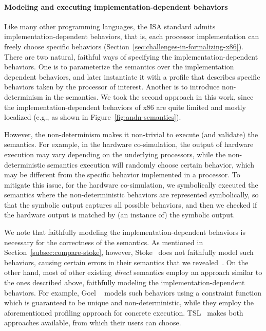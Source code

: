 \paragraph{Modeling and executing implementation-dependent behaviors}

Like many other programming languages, the \ISA ISA standard admits implementation-dependent behaviors, that is, each processor implementation can freely choose specific behaviors (Section~\ref{sec:challenges-in-formalizing-x86}).
There are two natural, faithful ways of specifying the implementation-dependent behaviors.
One is to parameterize the semantics over the implementation dependent behaviors, and later instantiate it with a profile that describes specific behaviors taken by the processor of interest.
Another is to introduce non-determinism in the semantics.
We took the second approach in this work, since the implementation-dependent behaviors of x86 are quite limited and mostly localized (e.g., as shown in Figure~\ref{fig:andn-semantics}).

However, the non-determinism makes it non-trivial to execute (and validate) the semantics.
For example, in the hardware co-simulation, the output of hardware execution may vary depending on the underlying processors, while the non-deterministic semantics execution will randomly choose certain behavior, which may be different from the specific behavior implemented in a processor.
To mitigate this issue, for the hardware co-simulation, we symbolically executed the semantics where the non-deterministic behaviors are represented symbolically, so that the symbolic output captures all possible behaviors, and then we checked if the hardware output is matched by (an instance of) the symbolic output.

We note that faithfully modeling the implementation-dependent behaviors is necessary for the correctness of the semantics.
As mentioned in Section~\ref{subsec:compare-stoke}, however, Stoke~\cite{Stoke2013} does not faithfully model such behaviors, causing certain errors in their semantics that we revealed~\cite{BugStoke986}.
On the other hand, most of other existing \emph{direct} \ISA semantics employ an approach similar to the ones described above, faithfully modeling the implementation-dependent behaviors.
For example, Goel \etal~\cite{Goel:ProCoS17} models such behaviors using a constraint function which is guaranteed to be unique and non-deterministic, while they employ the aforementioned profiling approach for concrete execution.
TSL~\cite{TSL:TOPLAS13} makes both approaches available, from which their users can choose.

